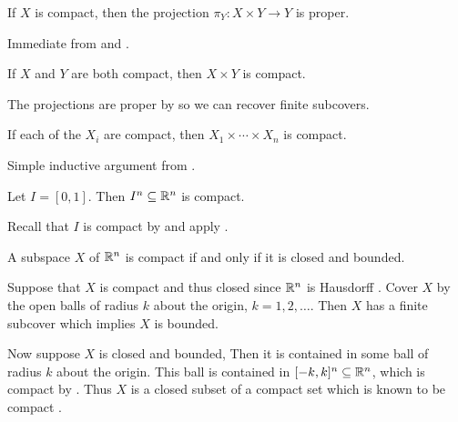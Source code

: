 \documentclass[letterpaper, 11pt]{article}
\begin{document}
\begin{cor}\label{cor: compact_projection_proper}
  If $X$ is compact, then the projection $\pi_{Y}\colon X \times Y \to Y$ is proper.
\end{cor}
\begin{pf}
  Immediate from  and .
\end{pf}

\begin{cor}\label{cor: prod_of_compact_is_compact}
  If $X$ and $Y$ are both compact, then $X \times Y$ is compact.
\end{cor}
\begin{pf}
  The projections are proper by  so we can recover finite subcovers.
\end{pf}

\begin{cor}\label{cor: tychonoff_finite}
  If each of the $X_{i}$ are compact, then $X_{1} \times \cdots \times X_{n}$ is compact.
\end{cor}
\begin{pf}
  Simple inductive argument from .
\end{pf}

\begin{cor}
  Let $I = [0, 1]$.
  Then $I^{n} \subseteq \mathbb{R}^{n}$ is compact.
\end{cor}
\begin{pf}
  Recall that $I$ is compact by  and apply .
\end{pf}

\begin{cor}
  A subspace $X$ of $\mathbb{R}^{n}$ is compact if and only if it is closed and bounded.
\end{cor}
\begin{pf}
  Suppose that $X$ is compact and thus closed since $\mathbb{R}^{n}$ is Hausdorff .
  Cover $X$ by the open balls of radius $k$ about the origin, $k = 1, 2, \ldots$.
  Then $X$ has a finite subcover which implies $X$ is bounded.

  Now suppose $X$ is closed and bounded,
  Then it is contained in some ball of radius $k$ about the origin.
  This ball is contained in $[-k, k]^{n} \subseteq \mathbb{R}^{n}$, which is compact by .
  Thus $X$ is a closed subset of a compact set which is known to be compact .
\end{pf}
\end{document}
